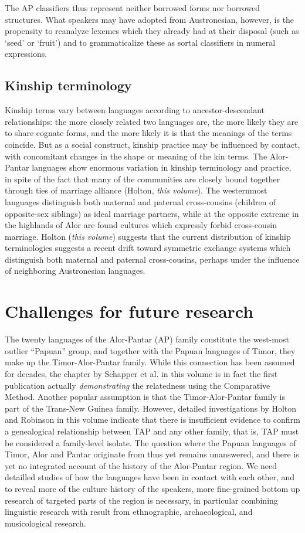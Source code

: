 The AP classifiers thus represent neither borrowed forms nor borrowed structures. What speakers may have adopted from Austronesian, however, is the propensity to reanalyze lexemes which they already had at their disposal (such as `seed' or `fruit') and to grammaticalize these as sortal classifiers in numeral expressions.

\subsection{Kinship terminology}
Kinship terms vary between languages according to ancestor-descendant relationships: the more closely related two languages are, the more likely they are to share cognate forms, and the more likely it is that the meanings of the terms coincide. But as a social construct, kinship practice may be influenced by contact, with concomitant changes in the shape or meaning of the kin terms. The Alor-Pantar languages show enormous variation in kinship terminology and practice, in spite of the fact that many of the communities are closely bound together through ties of marriage alliance (Holton, \textit{this volume}). The westernmost languages distinguish both maternal and paternal cross-cousins (children of opposite-sex siblings) as ideal marriage partners, while at the opposite extreme in the highlands of Alor are found cultures which expressly forbid cross-cousin marriage. Holton (\textit{this volume}) suggests that the current distribution of kinship terminologies suggests a recent drift toward symmetric exchange systems which distinguish both maternal and paternal cross-cousins, perhaps under the influence of neighboring Austronesian languages.

\section{Challenges for future research}

The twenty languages of the Alor-Pantar (AP) family constitute the west-most outlier ``Papuan'' group, and together with the Papuan languages of Timor, they make up the Timor-Alor-Pantar family. While this connection has been assumed for decades, the chapter by Schapper et al. in this volume is in fact the first publication actually \textit{demonstrating} the relatedness using the Comparative Method. Another popular assumption is that the Timor-Alor-Pantar family is part of the Trans-New Guinea family. However, detailed investigations by Holton and Robinson in this volume indicate that there is insufficient evidence to confirm a genealogical relationship between TAP and any other family, that is, TAP must be considered a family-level isolate. The question where the Papuan languages of Timor, Alor and Pantar originate from thus yet remains unanswered, and there is yet no integrated account of the history of the Alor-Pantar region. We need detailled studies of how the languages have been in contact with each other, and to reveal more of the culture history of the speakers, more fine-grained bottom up research of targeted parts of the region is necessary, in particular combining linguistic research with result from ethnographic, archaeological, and musicological research.

